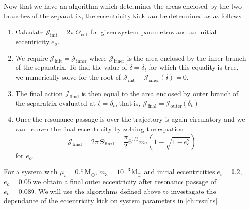 \documentclass[ twoside,openright,titlepage,numbers=noenddot,headinclude,%
                footinclude=true,cleardoublepage=empty,abstractoff, %
                BCOR=5mm,paper=a4,fontsize=11pt,%
                american,%
                ]{scrreprt}
\begin{document}
Now that we have an algorithm which determines the areas enclosed by the two
branches of the separatrix, the eccentricity kick can be determined as
as follows
\begin{enumerate}
    \item Calculate $\mathcal{J}_\text{init}=2\pi\,\Theta_\text{init}$ for given
        system parameters and an initial eccentricity $e_o$.
    \item We require $\mathcal{J}_\text{init}=\mathcal{J}_\text{inner}$ 
        where $\mathcal{J}_\text{inner}$ is the area enclosed by the inner
        branch of the separatrix. To find the value of $\delta=\delta_t$ for
        which this equality is true, we numerically solve for the root of
        $\mathcal{J}_\text{init}-\mathcal{J}_\text{inner}(\delta)=0$.
    \item The final action $\mathcal{J}_\text{final}$ is then equal to
        the area enclosed by outer branch of the separatrix evaluated at
        $\delta=\delta_t$, that is, $\mathcal{J}_\text{final}=
        \mathcal{J}_\text{outer}(\delta_t)$.
    \item Once the resonance passage is over the trajectory is again circulatory
        and we can recover the final eccentricity by solving the equation
        \begin{equation}
            \mathcal{J}_\text{final}=2\pi\,\Theta_\text{final}=
            \frac{\pi}{2} 6^{1/3}m_3\left(1-\sqrt{1-e_o^2}\right)
        \end{equation}
        for $e_o$. 
\end{enumerate}
For a system with $\mu_i=0.5\,\text{M}_\odot$, $m_3=10^{-3}\,\text{M}_\odot$ 
and initial eccentricities $e_i=0.2$, $e_o=0.05$ we obtain a final outer
eccentricity after resonance passage of $e_o=0.089$. We will use the
algorithms defined above to investagate the dependance of the eccentricity
kick on system parameters in \cref{ch:results}.
\end{document}
